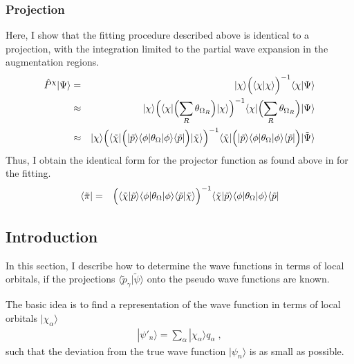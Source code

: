 \documentclass[11pt,a4paper]{report}
\begin{document}
\subsubsection{Projection}
Here, I show that the fitting procedure described above is identical to
a projection, with the integration limited to the partial wave
expansion in the augmentation regions.
\begin{eqnarray}
\hat{P}^\chi|\Psi\rangle
&=&|\chi\rangle\Bigl(\langle\chi|\chi\rangle\Bigr)^{-1}
\langle\chi|\Psi\rangle
\nonumber\\
%
%
&\approx&|\chi\rangle\Bigl(\langle\chi|
\Bigl(\sum_R \theta_{\Omega_R}\Bigr)
|\chi\rangle\Bigr)^{-1}
\langle\chi|\Bigl(\sum_R \theta_{\Omega_R}\Bigr)|\Psi\rangle
\nonumber\\
%
%
&\approx&|\chi\rangle\Bigl(\langle\tilde{\chi}|
\Bigl(
|\tilde{p}\rangle\langle\phi|\theta_{\Omega}|\phi\rangle\langle\tilde{p}|
\Bigr)
|\tilde{\chi}\rangle\Bigr)^{-1}
\langle\tilde{\chi}|
\Bigl(
|\tilde{p}\rangle\langle\phi|\theta_{\Omega}|\phi\rangle\langle\tilde{p}|
\Bigr)|\tilde{\Psi}\rangle
\end{eqnarray}
Thus, I obtain the identical form for the projector function as found
above in  for the fitting.
\begin{eqnarray}
\langle\tilde{\pi}|&=&\Bigl(\langle\tilde{\chi}|\tilde{p}\rangle
\langle\phi|\theta_\Omega|\phi\rangle
\langle\tilde{p}|\tilde{\chi}\rangle\Bigr)^{-1}
\langle\tilde{\chi}|\tilde{p}\rangle
\langle\phi|\theta_\Omega|\phi\rangle
\langle\tilde{p}|
\end{eqnarray}





\subsection{Introduction}
In this section, I describe how to determine the wave functions in
terms of local orbitals, if the projections
$\langle\tilde{p}_\gamma|\tilde{\psi}\rangle$ onto the pseudo wave
functions are known.

The basic idea is to find a representation of the wave function in
terms of local orbitals $|\chi_\alpha\rangle$
\begin{eqnarray}
|\psi'_n\rangle=\sum_\alpha |\chi_\alpha\rangle q_\alpha\;,
\end{eqnarray}
such that the deviation from the true wave function $|\psi_n\rangle$
is as small as possible.
\end{document}

